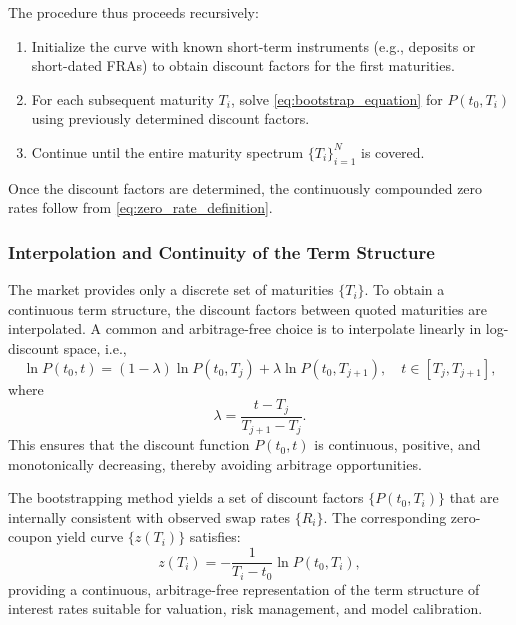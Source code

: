 The procedure thus proceeds recursively:
\begin{enumerate}
	\item Initialize the curve with known short-term instruments (e.g., deposits or short-dated FRAs) to obtain discount factors for the first maturities.
	\item For each subsequent maturity $T_i$, solve \eqref{eq:bootstrap_equation} for $P(t_0, T_i)$ using previously determined discount factors.
	\item Continue until the entire maturity spectrum $\{T_i\}_{i=1}^N$ is covered.
\end{enumerate}

Once the discount factors are determined, the continuously compounded zero rates follow from \eqref{eq:zero_rate_definition}.

\subsubsection{Interpolation and Continuity of the Term Structure}
The market provides only a discrete set of maturities $\{T_i\}$. To obtain a continuous term structure, the discount factors between quoted maturities are interpolated. A common and arbitrage-free choice is to interpolate linearly in log-discount space, i.e.,
\begin{equation}
	\ln P(t_0, t) = (1 - \lambda) \ln P(t_0, T_j) + \lambda \ln P(t_0, T_{j+1}),
	\quad t \in [T_j, T_{j+1}],
	\label{eq:log_linear_interpolation}
\end{equation}
where
\begin{equation}
	\lambda = \frac{t - T_j}{T_{j+1} - T_j}.
\end{equation}
This ensures that the discount function $P(t_0, t)$ is continuous, positive, and monotonically decreasing, thereby avoiding arbitrage opportunities.

The bootstrapping method yields a set of discount factors $\{P(t_0, T_i)\}$ that are internally consistent with observed swap rates $\{R_i\}$. The corresponding zero-coupon yield curve $\{z(T_i)\}$ satisfies:
\begin{equation}
	z(T_i) = -\frac{1}{T_i - t_0} \ln P(t_0, T_i),
\end{equation}
providing a continuous, arbitrage-free representation of the term structure of interest rates suitable for valuation, risk management, and model calibration.


